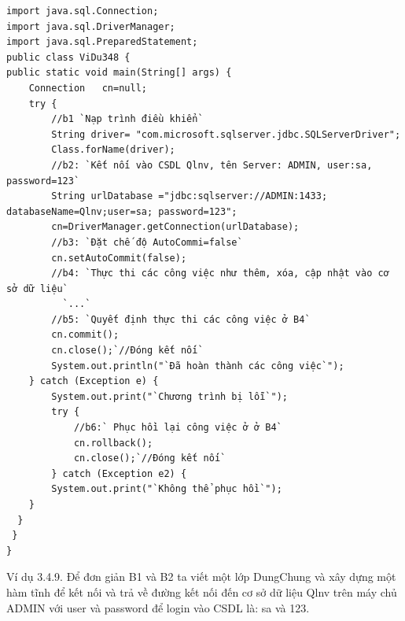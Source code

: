 \begin{lstlisting}[escapechar=`]
import java.sql.Connection;
import java.sql.DriverManager;
import java.sql.PreparedStatement;
public class ViDu348 {
public static void main(String[] args) {
	Connection   cn=null;
	try { 
		//b1 `Nạp trình điều khiển`
		String driver= "com.microsoft.sqlserver.jdbc.SQLServerDriver";
		Class.forName(driver);
		//b2: `Kết nối vào CSDL Qlnv, tên Server: ADMIN, user:sa, password=123`
		String urlDatabase ="jdbc:sqlserver://ADMIN:1433; databaseName=Qlnv;user=sa; password=123";
		cn=DriverManager.getConnection(urlDatabase);
	    //b3: `Đặt chế độ AutoCommi=false`
		cn.setAutoCommit(false);
		//b4: `Thực thi các công việc như thêm, xóa, cập nhật vào cơ sở dữ liệu`
		  `...`
		//b5: `Quyết định thực thi các công việc ở B4`
		cn.commit();
		cn.close();`//Đóng kết nối`
		System.out.println("`Đã hoàn thành các công việc`");
	} catch (Exception e) {
		System.out.print("`Chương trình bị lỗi`");
		try { 
			//b6:` Phục hồi lại công việc ở ở B4`
			cn.rollback();
			cn.close();`//Đóng kết nối`
		} catch (Exception e2) {
		System.out.print("`Không thể phục hồi`");
	}
  }
 }
}
\end{lstlisting}

Ví dụ 3.4.9.\label{3.4.9} Để đơn giản B1 và B2 ta viết một lớp DungChung và xây dựng một hàm tĩnh để kết nối và trả về đường kết nối đến cơ sở dữ liệu Qlnv trên máy chủ ADMIN với user và password để login vào CSDL là: sa và 123. 

